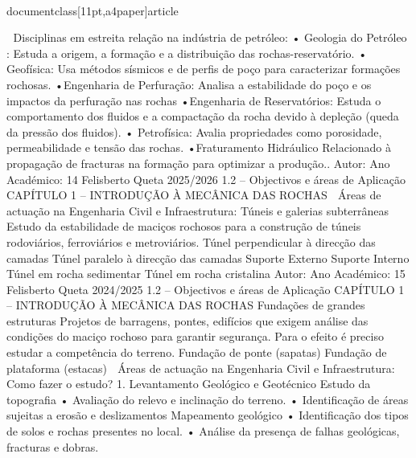 \\documentclass[11pt,a4paper]{article}
\begin{document}
 Disciplinas em estreita relação na indústria de petróleo:
• Geologia do Petróleo : Estuda a origem, a formação e a distribuição das rochas-reservatório.
• Geofísica: Usa métodos sísmicos e de perfis de poço para caracterizar formações rochosas.
•Engenharia de
Perfuração:
Analisa a estabilidade do poço e os impactos da perfuração nas rochas
•Engenharia de
Reservatórios:
Estuda o comportamento dos fluidos e a compactação da rocha devido à depleção (queda
da pressão dos fluidos).
• Petrofísica: Avalia propriedades como porosidade, permeabilidade e tensão das rochas.
•Fraturamento Hidráulico Relacionado à propagação de fracturas na formação para optimizar a produção..
Autor:
Ano Académico:
14
Felisberto Queta
2025/2026
1.2 – Objectivos e áreas de Aplicação
CAPÍTULO 1 
–
 INTRODUÇÃO À MECÂNICA DAS ROCHAS
 Áreas de actuação na Engenharia Civil e 
Infraestrutura:
Túneis e galerias
subterrâneas
Estudo da estabilidade de maciços rochosos para a construção de túneis rodoviários,
ferroviários e metroviários.
Túnel perpendicular à direcção das 
camadas
Túnel paralelo à direcção das 
camadas
Suporte Externo Suporte Interno
Túnel em rocha 
sedimentar
Túnel em rocha 
cristalina
Autor:
Ano Académico:
15
Felisberto Queta
2024/2025
1.2 – Objectivos e áreas de Aplicação
CAPÍTULO 1 
–
 INTRODUÇÃO À MECÂNICA DAS ROCHAS
Fundações de grandes estruturas
Projetos de barragens, pontes, edifícios que exigem análise
das condições do maciço rochoso para garantir segurança.
Para o efeito é preciso estudar a competência do terreno.
Fundação de ponte (sapatas) Fundação de plataforma (estacas)
 Áreas de actuação na Engenharia Civil e 
Infraestrutura:
Como fazer o estudo?
1. Levantamento Geológico e Geotécnico
Estudo da topografia
• Avaliação do relevo e inclinação do terreno.
• Identificação de áreas sujeitas a erosão e deslizamentos
Mapeamento geológico
• Identificação dos tipos de solos e rochas presentes no local.
• Análise da presença de falhas geológicas, fracturas e 
dobras.\
\end{document}
